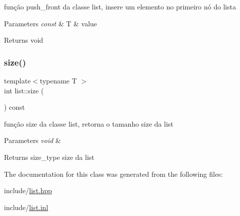 função push\+\_\+front da classe list, insere um elemento no primeiro nó do lista 
\begin{DoxyParams}{Parameters}
{\em const} & T \& value \\
\hline
\end{DoxyParams}
\begin{DoxyReturn}{Returns}
void 
\end{DoxyReturn}
\mbox{\label{classsc_1_1list_ae7dcc01498f6def3ffff29a35b36c2f3}} 
\subsubsection{\texorpdfstring{size()}{size()}}
{\footnotesize\ttfamily template$<$typename T $>$ \\
int list\+::size (\begin{DoxyParamCaption}{ }\end{DoxyParamCaption}) const}

função size da classe list, retorna o tamanho size da list 
\begin{DoxyParams}{Parameters}
{\em void} & \\
\hline
\end{DoxyParams}
\begin{DoxyReturn}{Returns}
size\+\_\+type size da list 
\end{DoxyReturn}


The documentation for this class was generated from the following files\+:\begin{DoxyCompactItemize}
\item 
include/\mbox{\hyperlink{list_8hpp}{list.\+hpp}}\item 
include/\mbox{\hyperlink{list_8inl}{list.\+inl}}\end{DoxyCompactItemize}
